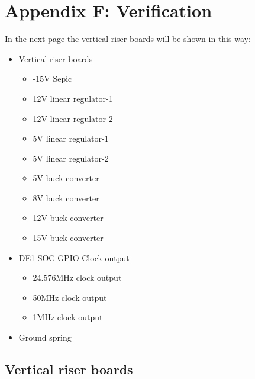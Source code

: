 \chapter*{Appendix F: Verification} \label{chap:Appendix-C-Verification}
In the next page the vertical riser boards will be shown in this way:

\begin{itemize}
    \item Vertical riser boards
   \begin{itemize}
    \item -15V Sepic
    \item 12V linear regulator-1
    \item 12V linear regulator-2
    \item 5V linear regulator-1
    \item 5V linear regulator-2
    \item 5V buck converter
    \item 8V buck converter
    \item 12V buck converter
    \item 15V buck converter
   \end{itemize}  
	\item DE1-SOC GPIO Clock output
	\begin{itemize}
	\item 24.576MHz clock output
	\item 50MHz clock output
	\item 1MHz clock output
	\end{itemize}
	\item Ground spring
\end{itemize}
\newpage
\section{Vertical riser boards} \label{Appendix-Vertical riser boards}



